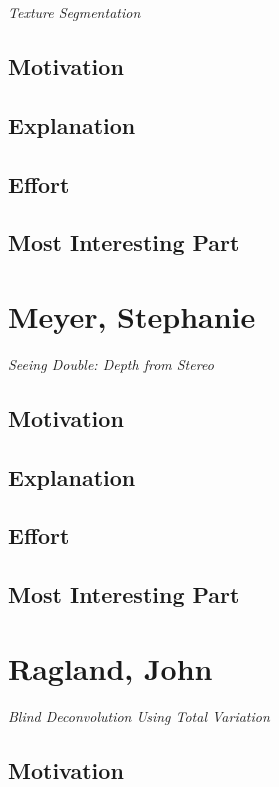 \documentclass[12pt]{article}
\begin{document}
\textit{Texture Segmentation}

\subsection{Motivation}

\subsection{Explanation}

\subsection{Effort}

\subsection{Most Interesting Part}

\newpage
\section{Meyer, Stephanie}

\textit{Seeing Double: Depth from Stereo}

\subsection{Motivation}

\subsection{Explanation}

\subsection{Effort}

\subsection{Most Interesting Part}

\newpage
\section{Ragland, John}

\textit{Blind Deconvolution Using Total Variation}

\subsection{Motivation}
\end{document}
